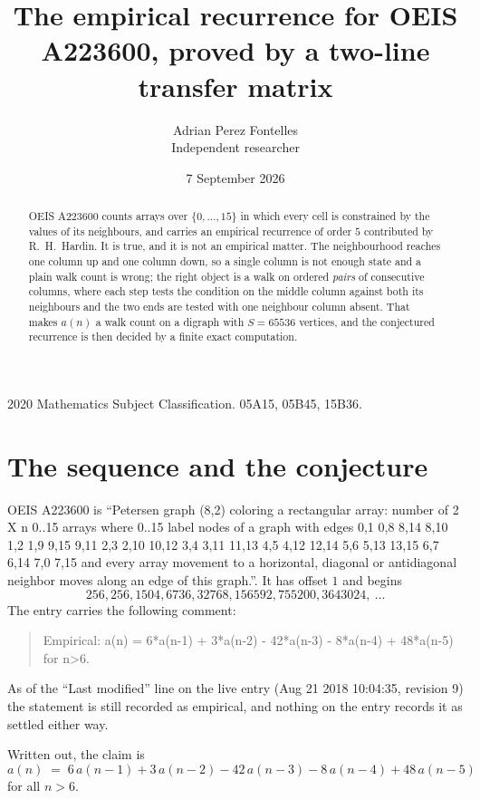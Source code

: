 \documentclass[11pt,a4paper]{article}
\title{The empirical recurrence for OEIS A223600, proved by a two-line transfer matrix}
\author{Adrian Perez Fontelles\\ \small Independent researcher}
\date{7 September 2026}
\theoremstyle{plain}
\theoremstyle{definition}
\begin{document}
\maketitle

\begin{abstract}
OEIS A223600 counts arrays over $\{0,\dots,15\}$ in which every cell is constrained by the
values of its neighbours, and carries an empirical recurrence of order $5$ contributed
by R.~H.~Hardin. It is true, and it is not an empirical matter. The neighbourhood reaches one
column up and one column down, so a single column is not enough state and a plain walk count
is wrong; the right object is a walk on ordered \emph{pairs} of consecutive columns, where
each step tests the condition on the middle column against both its neighbours and the two
ends are tested with one neighbour column absent. That makes $a(n)$ a walk count on a digraph
with $S=65536$ vertices, and the conjectured recurrence is then decided by a finite exact
computation.
\end{abstract}

\noindent\small 2020 Mathematics Subject Classification. 05A15, 05B45, 15B36.\normalsize

\section{The sequence and the conjecture}

OEIS A223600 is ``Petersen graph (8,2) coloring a rectangular array: number of 2 X n 0..15 arrays where 0..15 label nodes of a graph with edges 0,1 0,8 8,14 8,10 1,2 1,9 9,15 9,11 2,3 2,10 10,12 3,4 3,11 11,13 4,5 4,12 12,14 5,6 5,13 13,15 6,7 6,14 7,0 7,15 and every array movement to a horizontal, diagonal or antidiagonal neighbor moves along an edge of this graph.''. It has offset $1$ and begins
\[
256, 256, 1504, 6736, 32768, 156592, 755200, 3643024,\ \dots
\]
The entry carries the following comment:
\begin{quote}\small
Empirical: a(n) = 6*a(n-1) + 3*a(n-2) - 42*a(n-3) - 8*a(n-4) + 48*a(n-5) for n>6.
\end{quote}
As of the ``Last modified'' line on the live entry (Aug 21 2018 10:04:35, revision 9) the statement is
still recorded as empirical, and nothing on the entry records it as settled either way.

Written out, the claim is
\begin{equation}\label{eq:conj}
a(n)\;=\;6\,a(n-1) + 3\,a(n-2) - 42\,a(n-3) - 8\,a(n-4) + 48\,a(n-5)
\end{equation}
for all $n>6$.
\end{document}
